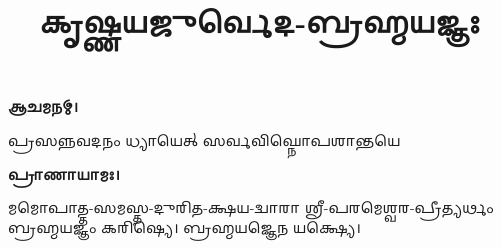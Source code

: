 \setmainfont[Scale=0.50,Script=Grantha,Mapping=tex-text,Mapping=devanagarinumerals,AutoFakeBold=2.0]{Noto Serif Grantha}
\title{\Huge 𑌕𑍃𑌷𑍍𑌣𑌯𑌜𑍁𑌰𑍍𑌵𑍇𑌦-𑌬𑍍𑌰𑌹𑍍𑌮𑌯𑌜𑍍𑌞𑌃}
\date{}
\maketitle
\clearemptydoublepage
{}


\textbf{𑌆𑌚𑌮𑌨𑌮𑍍।}

{𑌪𑍍𑌰𑌸𑌨𑍍𑌨𑌵𑌦𑌨𑌂 𑌧𑍍𑌯𑌾𑌯𑍇𑌤𑍍 𑌸𑌰𑍍𑌵𑌵𑌿𑌘𑍍𑌨𑍋𑌪𑌶𑌾𑌨𑍍𑌤𑌯𑍇}

\textbf{𑌪𑍍𑌰𑌾𑌣𑌾𑌯𑌾𑌮𑌃।}

𑌮𑌮𑍋𑌪𑌾𑌤𑍍𑌤-𑌸𑌮𑌸𑍍𑌤-𑌦𑍁𑌰𑌿𑌤-𑌕𑍍𑌷𑌯-𑌦𑍍𑌵𑌾𑌰𑌾 𑌶𑍍𑌰𑍀-𑌪𑌰𑌮𑍇𑌶𑍍𑌵𑌰-𑌪𑍍𑌰𑍀𑌤𑍍𑌯𑌰𑍍𑌥𑌂 𑌬𑍍𑌰𑌹𑍍𑌮𑌯𑌜𑍍𑌞𑌂 𑌕𑌰𑌿𑌷𑍍𑌯𑍇। 𑌬𑍍𑌰𑌹𑍍𑌮𑌯𑌜𑍍𑌞𑍇𑌨 𑌯𑌕𑍍𑌷𑍍𑌯𑍇।


